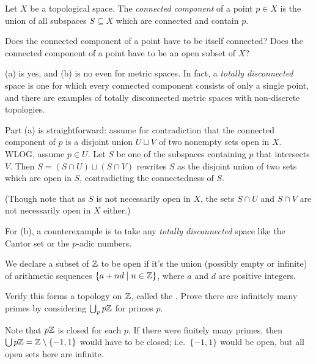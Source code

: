 \begin{problem}
	Let $X$ be a topological space.
	The \emph{connected component} of a point $p \in X$
	is the union of all subspaces $S \subseteq X$ which are connected and contain $p$.
	\begin{enumerate}[(a)]
		\ii Does the connected component of a point have to be itself connected?
		\ii Does the connected component of a point have to be an open subset of $X$?
	\end{enumerate}
	\begin{hint}
		(a) is yes, and (b) is no even for metric spaces.
		In fact, a \emph{totally disconnected} space is one for which
		every connected component consists of only a single point,
		and there are examples of totally disconnected metric spaces with
		non-discrete topologies.
	\end{hint}
	\begin{sol}
		Part (a) is straightforward:
		assume for contradiction that the connected component of $p$ is
		a disjoint union $U \sqcup V$ of two nonempty sets open in $X$.
		WLOG, assume $p \in U$.
		Let $S$ be one of the subspaces containing $p$ that intersects $V$.
		Then $S = (S \cap U) \sqcup (S \cap V)$ rewrites $S$ as the disjoint union
		of two sets which are open in $S$, contradicting the connectedness of $S$.

		(Though note that as $S$ is not necessarily open in $X$,
		the sets $S \cap U$ and $S \cap V$ are not necessarily open in $X$ either.)

		For (b), a counterexample is to take any \emph{totally disconnected} space
		like the Cantor set or the $p$-adic numbers.
	\end{sol}
\end{problem}

\begin{problem}[Furstenberg]
	We declare a subset of $\mathbb Z$ to be open if it's the union (possibly empty or infinite)
	of arithmetic sequences $\left\{ a + nd \mid n \in \mathbb Z \right\}$,
	where $a$ and $d$ are positive integers.
	\begin{enumerate}[(a)]
		\ii Verify this forms a topology on $\mathbb Z$,
		called the .
		\ii Prove there are infinitely many primes by considering $\bigcup_p p\mathbb Z$
		for primes $p$.
	\end{enumerate}
	\begin{hint}
		Note that $p\mathbb Z$ is closed for each $p$.
		If there were finitely many primes, then
		$\bigcup p\mathbb Z = \mathbb Z \setminus \{-1,1\}$ would have to be closed;
		i.e.\ $\{-1,1\}$ would be open, but all open sets here are infinite.
	\end{hint}
\end{problem}

